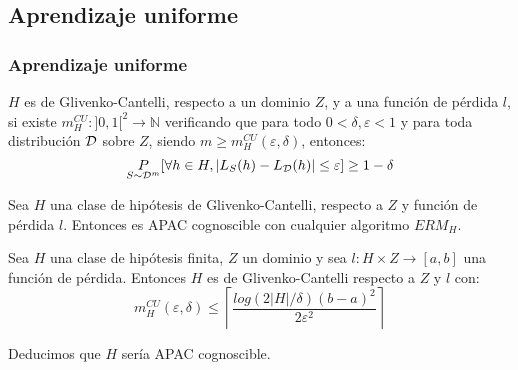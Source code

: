\subsection{Aprendizaje uniforme}
\begin{frame}\frametitle{Aprendizaje uniforme}
\vspace{1em}
 \begin{definition}
  $H$ es de Glivenko-Cantelli, respecto a un dominio $Z$, y a 
  una función de pérdida $l$, si existe ${m_{H}^{CU}: ]0,1[^2 \rightarrow \mathbb{N}}$ 
  verificando que para todo $0 < \delta, \varepsilon < 1$ y para toda distribución $\mathcal{D}$ sobre $Z$, 
  siendo $m \ge m_{H}^{CU}(\varepsilon, \delta)$, entonces:
  \[
    \underset{S\sim \mathcal{D}^m}{P} [\forall h\in H, |L_S(h) - L_{\mathcal{D}}(h)| \le \varepsilon] \ge 1-\delta
  \]
 \end{definition}
 
 \begin{theorem}
 Sea $H$ una clase de hipótesis de Glivenko-Cantelli, respecto a $Z$ y función de pérdida $l$. 
 Entonces es APAC cognoscible con cualquier algoritmo $ERM_H$.
 \end{theorem}
 
 \begin{fact}
  Sea $H$ una clase de hipótesis finita, $Z$ un dominio y sea $l : H \times Z \rightarrow [a,b]$ una función de pérdida.
  Entonces $H$ es de Glivenko-Cantelli respecto a $Z$ y $l$ con:
  \[
    m_{H}^{CU}(\varepsilon, \delta) \le \left\lceil \frac{log(2|H|/\delta)(b-a)^2}{2\varepsilon^2} \right\rceil
  \]
  
  Deducimos que $H$ sería APAC cognoscible.
 \end{fact}
\end{frame}

